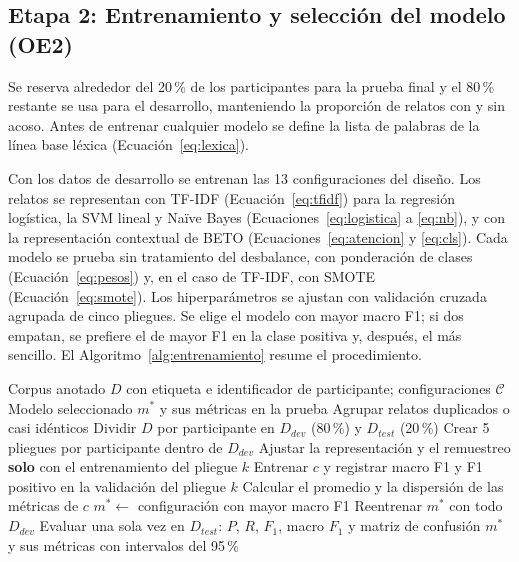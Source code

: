 \subsection{Etapa 2: Entrenamiento y selección del modelo (OE2)}
Se reserva alrededor del 20\,\% de los participantes para la prueba final y el 80\,\% restante se usa para el desarrollo, manteniendo la proporción de relatos con y sin acoso. Antes de entrenar cualquier modelo se define la lista de palabras de la línea base léxica (Ecuación~\ref{eq:lexica}).

Con los datos de desarrollo se entrenan las 13 configuraciones del diseño. Los relatos se representan con TF-IDF (Ecuación~\ref{eq:tfidf}) para la regresión logística, la SVM lineal y Naïve Bayes (Ecuaciones~\ref{eq:logistica} a \ref{eq:nb}), y con la representación contextual de BETO (Ecuaciones~\ref{eq:atencion} y \ref{eq:cls}). Cada modelo se prueba sin tratamiento del desbalance, con ponderación de clases (Ecuación~\ref{eq:pesos}) y, en el caso de TF-IDF, con SMOTE (Ecuación~\ref{eq:smote}). Los hiperparámetros se ajustan con validación cruzada agrupada de cinco pliegues. Se elige el modelo con mayor macro F1; si dos empatan, se prefiere el de mayor F1 en la clase positiva y, después, el más sencillo. El Algoritmo~\ref{alg:entrenamiento} resume el procedimiento.

\begin{algorithm}[H]
\caption{Entrenamiento, selección y validación del modelo}
\label{alg:entrenamiento}
\singlespacing
\begin{algorithmic}[1]
	\Require Corpus anotado $D$ con etiqueta e identificador de participante; configuraciones $\mathcal{C}$
	\Ensure Modelo seleccionado $m^{*}$ y sus métricas en la prueba
	\State Agrupar relatos duplicados o casi idénticos
	\State Dividir $D$ por participante en $D_{dev}$ (80\,\%) y $D_{test}$ (20\,\%) 
	\State Crear 5 pliegues por participante dentro de $D_{dev}$
			\State Ajustar la representación y el remuestreo \textbf{solo} con el entrenamiento del pliegue $k$
			\State Entrenar $c$ y registrar macro F1 y F1 positivo en la validación del pliegue $k$
		\EndFor
		\State Calcular el promedio y la dispersión de las métricas de $c$
	\EndFor
	\State $m^{*} \gets$ configuración con mayor macro F1
	\State Reentrenar $m^{*}$ con todo $D_{dev}$
	\State Evaluar una sola vez en $D_{test}$: $P$, $R$, $F_1$, macro $F_1$ y matriz de confusión
	\State \Return $m^{*}$ y sus métricas con intervalos del 95\,\%
\end{algorithmic}
\end{algorithm}

